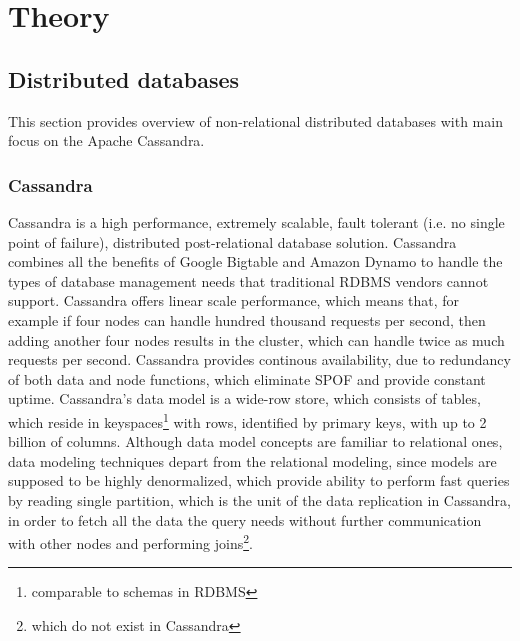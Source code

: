 
\chapter{Theory}\label{chapter:theory}

\section{Distributed databases}\label{sec:theory:distDbs}
This section provides overview of non-relational distributed databases with main focus on the Apache Cassandra.


\subsection{Cassandra}
Cassandra is a high performance, extremely scalable, fault tolerant (i.e. no single point of failure), distributed post-relational database solution. Cassandra combines all the benefits of Google Bigtable \cite{chang2008bigtable} and Amazon Dynamo \cite{decandia2007dynamo} to handle the types of database management needs that traditional RDBMS vendors cannot support. 
Cassandra offers linear scale performance, which means that, for example if four nodes can handle hundred thousand requests per second, then adding another four nodes results in the cluster, which can handle twice as much requests per second. Cassandra provides continous availability, due to redundancy of both data and node functions, which eliminate SPOF and provide constant uptime. Cassandra's data model is a wide-row store, which consists of tables, which reside in keyspaces\footnote{comparable to schemas in RDBMS} with rows, identified by primary keys, with up to 2 billion of columns. Although data model concepts are familiar to relational ones, data modeling techniques depart from the relational modeling, since models are supposed to be highly denormalized, which provide ability to perform fast queries by reading single partition, which is the unit of the data replication in Cassandra, in order to fetch all the data the query needs without further communication with other nodes and performing joins\footnote{which do not exist in Cassandra}.


